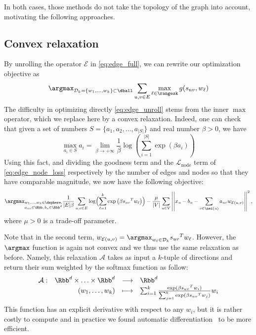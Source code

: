 In both cases, those methods do not take the topology of the graph into account, motivating the
following approaches.

\subsection{Convex relaxation}
\label{sub:edge_vector}

By unrolling the operator $\mathcal{E}$ in \eqref{eq:edge_full}, we can rewrite our optimization
objective as
\begin{equation}
  \label{eq:edge_unroll}
  \argmax_{\mathcal{D}_k = \{w_1,\ldots,w_k\} \subset \dball}
  \sum_{u,v \in E}  \max_{\ell \in \rangesk} g(s_{uv}, w_\ell)
\end{equation}
The difficulty in optimizing directly \eqref{eq:edge_unroll} stems from the inner $\max$ operator, which we
replace here by a convex relaxation. Indeed, one can check that given a set of numbers $S=\{a_1,
a_2, \ldots, a_{|S|}\}$ and real number $\beta > 0$, we have
\begin{equation*}
  \max_{a_i \in S} a_i = \lim_{\beta \rightarrow + \infty} \frac{1}{\beta}
  \log\left( \sum_{i=1}^{|S|} \exp{(\beta a_i)} \right)
\end{equation*}
  \label{}
Using this fact, and dividing the goodness term and the $\mathcal{L}_{\mathrm{node}}$ term of
\eqref{eq:edge_node_loss} respectively by the number of edges and nodes so that they have comparable
magnitude, we now have the following objective:
\begin{equation}
  \label{eq:edge_soft_early}
  \argmax_{{\substack{w_1,\ldots,w_k \in \dsphere,\\
  a_{uv}\in\Rbb,\, b_u \in \Rbb^d}}}
  \frac{1}{|E|\beta} \sum_{u,v\in E}
  \log\Bigl(\sum_{\ell=1}^k\exp\left(\beta {s_{uv}}^T w_\ell \right)\Bigr)
  - \frac{\mu}{|V|}\sum_{u\in V}
  \left|\left| x_u - b_u - \sum_{v \in \nei(u)} a_{uv} w_{\mathcal{E}(u,v)} \right|\right|^2,
\end{equation}
where $\mu > 0$ is a trade-off parameter.

Note that in the second term, $w_{\mathcal{E}(u,v)} = \argmax_{w_\ell \in \mathcal{D}_k} {s_{uv}}^T
w_\ell$. However, the $\argmax$
function is again not convex and we thus use the same relaxation as before. Namely, this relaxation
$\mathcal{A}$ takes as input a $k$-tuple of directions and return their sum weighted by the softmax
function as follow:
$$ \begin{array}[t]{lrcl}
  \mathcal{A} : & \Rbb^d \times \ldots \times \Rbb^d & \longrightarrow & \Rbb^d \\
      & (w_1,\ldots,w_k) & \longmapsto &
  \sum_{i=1}^k \frac{\exp(\beta{s_{uv}}^T w_i)}{\sum_{j=1}^k \exp(\beta {s_{uv}}^T w_j)} w_i
\end{array} $$
This function has an explicit derivative with respect to any $w_i$, but it is rather costly to
compute and in practice we
found automatic differentiation~\autocite{autograd15} to be more efficient.

